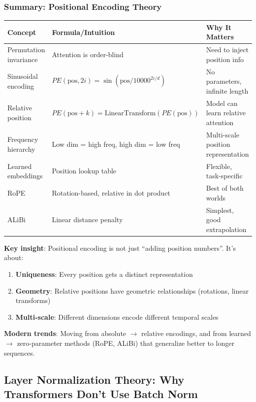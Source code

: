 \documentclass[11pt,oneside]{book}
\begin{document}
\subsubsection{Summary: Positional Encoding Theory}

\begin{center}
\begin{tabular}{lll}
\hline
\textbf{Concept} & \textbf{Formula/Intuition} & \textbf{Why It Matters} \\
\hline
Permutation invariance & Attention is order-blind & Need to inject position info \\
Sinusoidal encoding & $PE(\text{pos}, 2i) = \sin(\text{pos}/10000^{2i/d})$ & No parameters, infinite length \\
Relative position & $PE(\text{pos}+k) = \text{LinearTransform}(PE(\text{pos}))$ & Model can learn relative attention \\
Frequency hierarchy & Low dim = high freq, high dim = low freq & Multi-scale position representation \\
Learned embeddings & Position lookup table & Flexible, task-specific \\
RoPE & Rotation-based, relative in dot product & Best of both worlds \\
ALiBi & Linear distance penalty & Simplest, good extrapolation \\
\hline
\end{tabular}
\end{center}

\textbf{Key insight}: Positional encoding is not just ``adding position numbers''. It's about:
\begin{enumerate}
\item \textbf{Uniqueness}: Every position gets a distinct representation
\item \textbf{Geometry}: Relative positions have geometric relationships (rotations, linear transforms)
\item \textbf{Multi-scale}: Different dimensions encode different temporal scales
\end{enumerate}

\textbf{Modern trends}: Moving from absolute $\to$ relative encodings, and from learned $\to$ zero-parameter methods (RoPE, ALiBi) that generalize better to longer sequences.

\subsection{Layer Normalization Theory: Why Transformers Don't Use Batch Norm}
\end{document}
